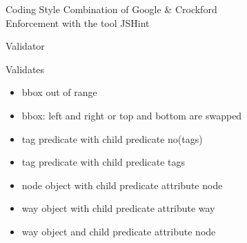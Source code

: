 \documentclass{beamer}
\begin{document}
\begin{frame}{Coding Style}
    \normalsize
    Combination of Google \& Crockford\\
    Enforcement with the tool JSHint
\end{frame}

\begin{frame}{Validator}

    \begin{block}{Validates}
        \begin{itemize}
            \item bbox out of range
            \item bbox: left and right or top and bottom are swapped
            \item tag predicate with child predicate no(tags)
            \item tag predicate with child predicate tags
            \item node object with child predicate attribute node
            \item way object with child predicate attribute way
            \item way object and child predicate attribute node
        \end{itemize}
    \end{block}

\end{frame}
\end{document}
